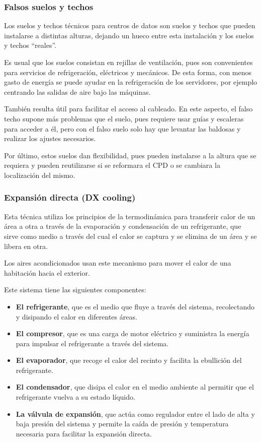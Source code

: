 \subsubsection{Falsos suelos y techos}

Los suelos y techos técnicos para centros de datos son suelos y techos que pueden instalarse a distintas alturas, dejando un hueco entre esta instalación y los suelos y techos “reales”.

Es usual que los suelos consistan en rejillas de ventilación, pues son convenientes para servicios de refrigeración, eléctricos y mecánicos. De esta forma, con menos gasto de energía se puede ayudar en la refrigeración de los servidores, por ejemplo centrando las salidas de aire bajo las máquinas.

También resulta útil para facilitar el acceso al cableado. En este aspecto, el falso techo supone más problemas que el suelo, pues requiere usar guías y escaleras para acceder a él, pero con el falso suelo solo hay que levantar las baldosas y realizar los ajustes necesarios.

Por último, estos suelos dan flexibilidad, pues pueden instalarse a la altura que se requiera y pueden reutilizarse si se reformara el CPD o se cambiara la localización del mismo.

\subsubsection{Expansión directa (DX cooling)}

Esta técnica utiliza los principios de la termodinámica para transferir calor de un área a otra a través de la evaporación y condensación de un refrigerante, que sirve como medio a través del cual el calor se captura y se elimina de un área y se libera en otra.

Los aires acondicionados usan este mecanismo para mover el calor de una habitación hacia el exterior.

Este sistema tiene las siguientes componentes:

\begin{itemize}
    \item {\textbf{El refrigerante}}, que es el medio que fluye a través del sistema, recolectando y disipando el calor en diferentes áreas.
    \item \textbf{El compresor}, que es una carga de motor eléctrico y suministra la energía para impulsar el refrigerante a través del sistema.
    \item \textbf{El evaporador}, que recoge el calor del recinto y facilita la ebullición del refrigerante.
    \item \textbf{El condensador}, que disipa el calor en el medio ambiente al permitir que el refrigerante vuelva a su estado líquido.
    \item \textbf{La válvula de expansión}, que actúa como regulador entre el lado de alta y baja presión del sistema y permite la caída de presión y temperatura necesaria para facilitar la expansión directa.
\end{itemize}

